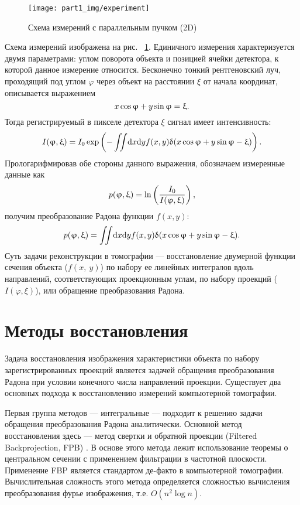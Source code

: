 \begin{figure}[h!]
  \centering
  \texttt{[image: part1\_img/experiment]}
  \caption{Схема измерений с параллельным пучком (2D)}
  \label{fig:experiment}
\end{figure}

Схема измерений изображена на рис. ~\ref{fig:experiment}.
Единичного измерения характеризуется двумя параметрами: углом поворота объекта и позицией ячейки детектора, к которой данное измерение относится.
Бесконечно тонкий рентгеновский луч, проходящий под углом $\varphi$  через объект на расстоянии $\xi$  от начала координат, описывается выражением
\begin{equation}\notag
  x\cos\varphi + y\sin\varphi = \xi.
\end{equation}
Тогда регистрируемый в пикселе детектора $\xi$ сигнал имеет интенсивность:
\begin{equation}\notag
  I(\varphi, \xi) = I_0 \exp\left( {-\iint \! \mathrm d x \mathrm d y f(x,y)\delta(x\cos\varphi + y\sin\varphi - \xi)}\right).
\end{equation}
Прологарифмировав обе стороны данного выражения, обозначаем измеренные данные как
\begin{equation}\notag
  p(\varphi, \xi) = \ln \left (\frac{I_0}{I(\varphi, \xi)} \right),
\end{equation}
получим преобразование Радона функции $f(x,y)$:
\begin{equation}\notag
  p(\varphi, \xi)= \iint \! \mathrm d x \mathrm d y f(x,y)\delta(x\cos\varphi + y\sin\varphi - \xi).
\end{equation}
Суть задачи реконструкции в томографии --- восстановление двумерной функции сечения объекта ($f(x,\ y)$) по набору ее линейных интегралов вдоль направлений, соответствующих проекционным углам, по набору проекций ($I(\varphi, \xi)$), или обращение преобразования Радона.

\section{Методы восстановления}
Задача восстановления изображения характеристики объекта по набору зарегистрированных проекций является задачей обращения преобразования Радона при условии конечного числа направлений проекции.
Существует два основных подхода к восстановлению измерений компьютерной томографии.

Первая группа методов --- интегральные \cite{herman2013mathematical}  --- подходит к решению задачи обращения преобразования Радона аналитически. 
Основной метод восстановления здесь --- метод свертки и обратной проекции (Filtered Backprojection, FPB) \cite{buzug2008computed}.
В основе этого метода лежит использование теоремы о центральном сечении с применением фильтрации в частотной плоскости.
Применение FBP является стандартом де-факто в компьютерной томографии. 
Вычислительная сложность этого метода определяется сложностью вычисления преобразования фурье изображения, т.е. $O(n^2 \log n)$.

